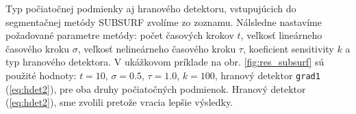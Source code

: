\documentclass[a4paper,11pt,oneside]{article}%
\begin{document}
\begin{figure}[H]%
    \centering
    \qquad
    \caption{}%
    \label{fig:pp}%
\end{figure}

Typ počiatočnej podmienky aj hranového detektoru, vstupujúcich do segmentačnej metódy SUBSURF zvolíme zo zoznamu. Nálsledne nastavíme požadované parametre metódy: počet časových krokov $t$, veľkosť lineárneho časového kroku $\sigma$, veľkosť nelineárneho časového kroku $\tau$, koeficient sensitivity $k$ a typ hranového detektora. V ukážkovom príklade na obr. \ref{fig:res_subsurf} sú použité hodnoty: $t = 10$, $\sigma = 0.5$, $\tau = 1.0$, $k = 100$, hranový detektor \texttt{grad1} (\ref{eq:hdet2}), pre oba druhy počiatočných podmienok. Hranový detektor (\ref{eq:hdet2}), sme zvolili pretože vracia lepšie výsledky.
\end{document}
